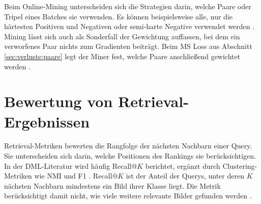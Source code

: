 Beim Online-Mining unterscheiden sich die Strategien darin, welche Paare oder Tripel eines Batches sie verwenden. Es können beispielsweise alle, nur die härtesten Positiven und Negativen oder semi-harte Negative verwendet werden \cite{musgrave_metric_2020,schroff_facenet_2015}. Mining lässt sich auch als Sonderfall der Gewichtung auffassen, bei dem ein verworfenes Paar nichts zum Gradienten beiträgt. Beim \ac{MS} Loss aus Abschnitt \ref{sec:verluste:paare} legt der Miner fest, welche Paare anschließend gewichtet werden \cite{wang_multi-similarity_2019}.

\section{Bewertung von Retrieval-Ergebnissen}
\label{sec:bewertung}

Retrieval-Metriken bewerten die Rangfolge der nächsten Nachbarn einer Query. Sie unterscheiden sich darin, welche Positionen des Rankings sie berücksichtigen. In der \ac{DML}-Literatur wird häufig Recall@$K$ berichtet, ergänzt durch Clustering-Metriken wie \ac{NMI} und F1 \cite{musgrave_metric_2020}. Recall@$K$ ist der Anteil der Querys, unter deren $K$ nächsten Nachbarn mindestens ein Bild ihrer Klasse liegt. Die Metrik berücksichtigt damit nicht, wie viele weitere relevante Bilder gefunden werden \cite{song_deep_2016}. 


